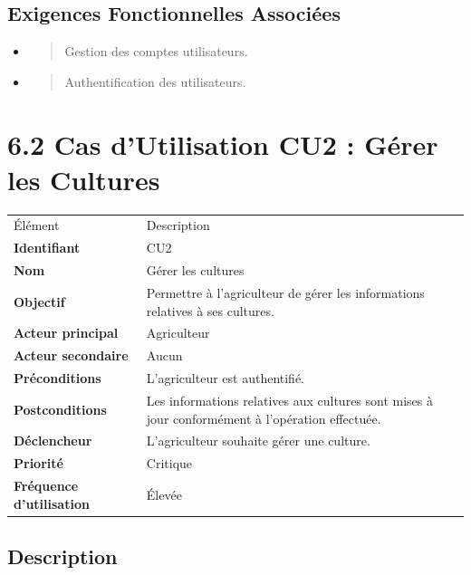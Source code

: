 \documentclass[
]{book}
\begin{document}
\hypertarget{exigences-fonctionnelles-associuxe9es}{%
\subsection{Exigences Fonctionnelles
Associées}\label{exigences-fonctionnelles-associuxe9es}}

\begin{itemize}
\item
  \begin{quote}
  Gestion des comptes utilisateurs.
  \end{quote}
\item
  \begin{quote}
  Authentification des utilisateurs.
  \end{quote}
\end{itemize}

\hypertarget{cas-dutilisation-cu2-guxe9rer-les-cultures}{%
\section{6.2 Cas d'Utilisation CU2 : Gérer les
Cultures}\label{cas-dutilisation-cu2-guxe9rer-les-cultures}}

\begin{longtable}[]{@{}ll@{}}
\toprule
\endhead
Élément & Description \\
\textbf{Identifiant} & CU2 \\
\textbf{Nom} & Gérer les cultures \\
\textbf{Objectif} & Permettre à l'agriculteur de gérer les informations
relatives à ses cultures. \\
\textbf{Acteur principal} & Agriculteur \\
\textbf{Acteur secondaire} & Aucun \\
\textbf{Préconditions} & L'agriculteur est authentifié. \\
\textbf{Postconditions} & Les informations relatives aux cultures sont
mises à jour conformément à l'opération effectuée. \\
\textbf{Déclencheur} & L'agriculteur souhaite gérer une culture. \\
\textbf{Priorité} & Critique \\
\textbf{Fréquence d'utilisation} & Élevée \\
\bottomrule
\end{longtable}

\hypertarget{description}{%
\subsection{Description}\label{description}}
\end{document}

